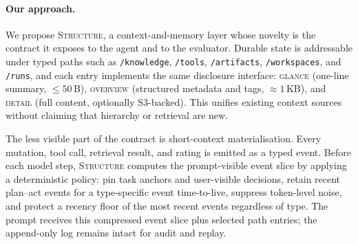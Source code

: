 \paragraph{Our approach.} We propose \textsc{Structure}, a
context-and-memory layer whose novelty is the contract it exposes to
the agent and to the evaluator. Durable state is addressable under
typed paths such as \texttt{/knowledge}, \texttt{/tools},
\texttt{/artifacts}, \texttt{/workspaces}, and \texttt{/runs}, and each
entry implements the same disclosure interface:
\textsc{glance} (one-line summary, $\leq 50$\,B), \textsc{overview}
(structured metadata and tags, $\approx 1$\,KB), and \textsc{detail}
(full content, optionally S3-backed). This unifies existing context
sources without claiming that hierarchy or retrieval are new.

The less visible part of the contract is short-context materialisation.
Every mutation, tool call, retrieval result, and rating is
emitted as a typed event. Before each model step, \textsc{Structure}
computes the prompt-visible event slice by applying a deterministic
policy: pin task anchors and user-visible decisions, retain recent
plan--act events for a type-specific event time-to-live, suppress
token-level noise, and protect a recency floor of the most recent
events regardless of type. The prompt receives this
compressed event slice plus selected path entries; the append-only log
remains intact for audit and replay.

